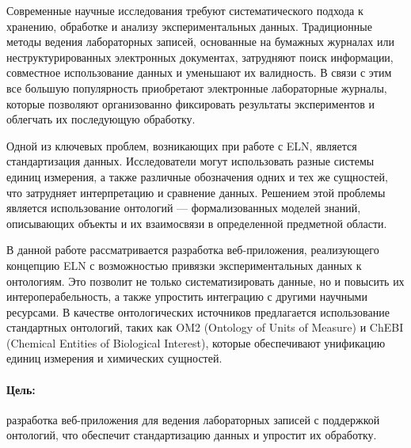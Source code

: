 
Современные научные исследования требуют систематического подхода к хранению, обработке и анализу экспериментальных данных. Традиционные методы ведения лабораторных записей, основанные на бумажных журналах или неструктурированных электронных документах, затрудняют поиск информации, совместное использование данных и уменьшают их валидность. В связи с этим все большую популярность приобретают электронные лабораторные журналы, которые позволяют организованно фиксировать результаты экспериментов и облегчать их последующую обработку.

Одной из ключевых проблем, возникающих при работе с ELN, является стандартизация данных. Исследователи могут использовать разные системы единиц измерения, а также различные обозначения одних и тех же сущностей, что затрудняет интерпретацию и сравнение данных. Решением этой проблемы является использование онтологий — формализованных моделей знаний, описывающих объекты и их взаимосвязи в определенной предметной области.

В данной работе рассматривается разработка веб-приложения, реализующего концепцию ELN с возможностью привязки экспериментальных данных к онтологиям. Это позволит не только систематизировать данные, но и повысить их интероперабельность, а также упростить интеграцию с другими научными ресурсами. В качестве онтологических источников предлагается использование стандартных онтологий, таких как OM2 (Ontology of Units of Measure) и ChEBI (Chemical Entities of Biological Interest), которые обеспечивают унификацию единиц измерения и химических сущностей.

\paragraph*{Цель:} разработка веб-приложения для ведения лабораторных записей с поддержкой онтологий, что обеспечит стандартизацию данных и упростит их обработку.

